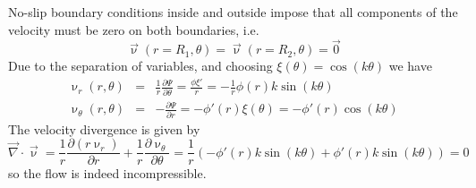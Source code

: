 No-slip boundary conditions inside and outside impose that all components of the velocity
must be zero on both boundaries, i.e.
\[
\vec{\upnu}(r=R_1,\theta)=\vec{\upnu}(r=R_2,\theta)=\vec{0}
\]
Due to the separation of variables, and choosing 
$\boxed{\xi(\theta)=\cos(k\theta)}$ we have
\begin{eqnarray}
\upnu_r(r,\theta) 
&=& \frac{1}{r}\frac{\partial \Psi}{\partial \theta} 
=\frac{\phi \xi'}{r}  
=-\frac{1}{r} \phi(r) k \sin(k \theta)  \\
\upnu_\theta(r,\theta) 
&=& - \frac{\partial \Psi}{\partial r} 
= - \phi'(r) \xi (\theta)
= - \phi'(r) \cos(k\theta)
\end{eqnarray}
The velocity divergence is given by
\[
\vec\nabla\cdot\vec\upnu = 
\frac{1}{r} \frac{\partial (r\upnu_r)}{\partial r} + \frac{1}{r} \frac{\partial \upnu_\theta}{\partial \theta} 
=
\frac{1}{r}
\left(
- \phi'(r) k \sin(k\theta) + \phi'(r) k \sin(k\theta) 
\right)=0
\]
so the flow is indeed incompressible.

